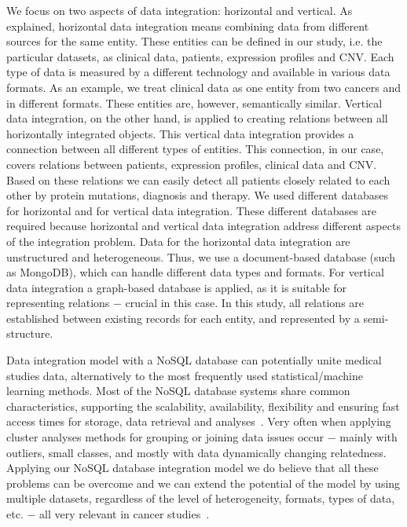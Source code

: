 \documentclass{bmcart}
\begin{document}
We focus on two aspects of data integration: horizontal and vertical. As
explained, horizontal data integration means combining data from
different sources for the same entity. These entities can be defined in
our study, i.e. the particular datasets, as clinical data, patients,
expression profiles and CNV. Each type of data is measured by a
different technology and available in various data formats. As an
example, we treat clinical data as one entity from two cancers and in
different formats. These entities are, however, semantically similar.
Vertical data integration, on the other hand, is applied to creating
relations between all horizontally integrated objects. This vertical
data integration provides a connection between all different types of
entities. This connection, in our case, covers relations between
patients, expression profiles, clinical data and CNV. Based on these
relations we can easily detect all patients closely related to each
other by protein mutations, diagnosis and therapy. We used different
databases for horizontal and for vertical data integration. These
different databases are required because horizontal and vertical data
integration address different aspects of the integration problem. Data
for the horizontal data integration are unstructured and heterogeneous.
Thus, we use a document-based database (such as MongoDB), which can
handle different data types and formats. For vertical data integration
a graph-based database is applied, as it is suitable for representing
relations $-$ crucial in this case. In this study, all relations are
established between existing records for each entity, and represented
by a semi-structure.

Data integration model with a NoSQL database can potentially unite
medical studies data, alternatively to the most frequently used
statistical/machine learning methods. Most of the NoSQL database
systems share common characteristics, supporting the scalability,
availability, flexibility and ensuring fast access times for storage,
data retrieval and analyses~\cite{21, 22}. Very often when applying cluster
analyses methods for grouping or joining data issues occur $-$ mainly
with outliers, small classes, and mostly with data dynamically changing
relatedness. Applying our NoSQL database integration model we do
believe that all these problems can be overcome and we can extend the
potential of the model by using multiple datasets, regardless of the
level of heterogeneity, formats, types of data, etc. $-$ all very
relevant in cancer studies~\cite{14}.
\end{document}
